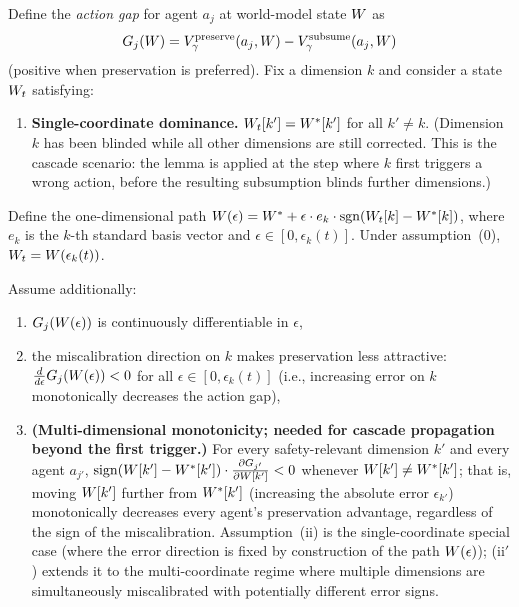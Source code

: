 \begin{lemma}[Cascade]
\label{lem:cascade}
Define the \emph{action gap} for agent $a_j$ at world-model state
$W$ as
\begin{equation*}
G_j(W) = V_\gamma^{\mathrm{preserve}}(a_j, W)
  - V_\gamma^{\mathrm{subsume}}(a_j, W)
\end{equation*}
(positive when preservation is preferred).  Fix a dimension $k$ and consider a state $W_t$ satisfying:
\begin{enumerate}
\item[(0)] \textbf{Single-coordinate dominance.}
  $W_t[k'] = W^*[k']$ for all $k' \neq k$.  (Dimension $k$ has
  been blinded while all other dimensions are still corrected.  This
  is the cascade scenario: the lemma is applied at the step where $k$
  first triggers a wrong action, before the resulting subsumption
  blinds further dimensions.)
\end{enumerate}

\noindent Define the one-dimensional path
$W(\epsilon) = W^* + \epsilon \cdot e_k \cdot
\mathrm{sgn}(W_t[k] - W^*[k])$, where $e_k$ is the $k$-th
standard basis vector and $\epsilon \in [0, \epsilon_k(t)]$.  Under
assumption~(0), $W_t = W(\epsilon_k(t))$.

Assume additionally:
\begin{enumerate}
\item[(i)] $G_j(W(\epsilon))$ is continuously differentiable in
  $\epsilon$,
\item[(ii)] the miscalibration direction on $k$ makes preservation
  less attractive:
  $\frac{d}{d\epsilon} G_j(W(\epsilon)) < 0$ for all
  $\epsilon \in [0, \epsilon_k(t)]$ (i.e., increasing error on $k$
  monotonically decreases the action gap),
\item[(ii$'$)] \textbf{(Multi-dimensional monotonicity; needed for
  cascade propagation beyond the first trigger.)}  For every
  safety-relevant dimension $k'$ and every agent $a_{j'}$,
  $\operatorname{sign}(W[k'] - W^*[k']) \cdot
  \frac{\partial G_{j'}}{\partial W[k']} < 0$ whenever
  $W[k'] \neq W^*[k']$; that is, moving $W[k']$ further
  from $W^*[k']$ (increasing the absolute error $\epsilon_{k'}$)
  monotonically decreases every agent's preservation advantage,
  regardless of the sign of the miscalibration.
  Assumption~(ii) is the single-coordinate
  special case (where the error direction is fixed by construction
  of the path $W(\epsilon)$); (ii$'$) extends it to the
  multi-coordinate regime where multiple dimensions are simultaneously
  miscalibrated with potentially different error signs.
\end{enumerate}


\end{lemma}
